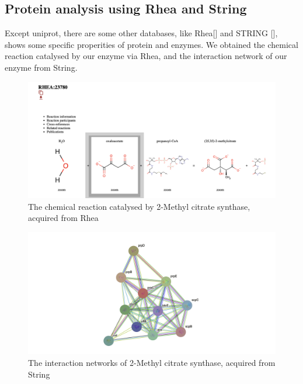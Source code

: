 \documentclass[a4paper,english,12pt,bibliography=totoc]{scrreprt}
\begin{document}

\subsection{Protein analysis using Rhea and String}

Except uniprot, there are some other databases, like Rhea[\cite{bansal_rhea_2022}] and STRING [\cite{szklarczyk_string_2021}], shows some specific properities of protein and enzymes. We obtained the chemical reaction catalysed by our enzyme via Rhea, and the interaction network of our enzyme from String.

\begin{figure}[H]
    \centering
    \includegraphics[width=0.9\linewidth]{Project 2/Images from Rhea and String/Rhea.png}
    \caption{The chemical reaction catalysed by 2-Methyl citrate synthase, acquired from Rhea}
\end{figure}


\begin{figure}[H]
    \centering
    \includegraphics[width=0.9\linewidth]{Project 2/Images from Rhea and String/string 1.png}
    \caption{The interaction networks of 2-Methyl citrate synthase, acquired from String }
\end{figure}
\end{document}
